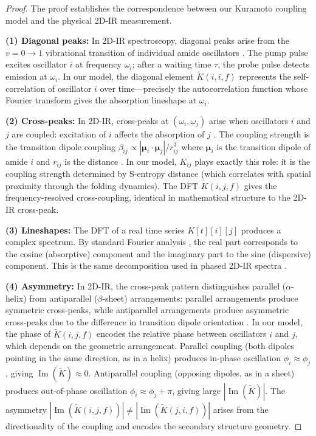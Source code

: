 \documentclass[11pt,twocolumn,a4paper]{article}
\theoremstyle{definition}
\theoremstyle{remark}
\newcommand{\Ktilde}{\tilde{K}}
\newcommand{\natfreq}{\omega}
\begin{document}
\begin{proof}
The proof establishes the correspondence between our Kuramoto coupling model and the physical 2D-IR measurement.

\textbf{(1) Diagonal peaks:} In 2D-IR spectroscopy, diagonal peaks arise from the $v=0 \to 1$ vibrational transition of individual amide oscillators \citep{hamm2011}. The pump pulse excites oscillator $i$ at frequency $\natfreq_i$; after a waiting time $\tau$, the probe pulse detects emission at $\natfreq_i$. In our model, the diagonal element $\Ktilde(i, i, f)$ represents the self-correlation of oscillator $i$ over time---precisely the autocorrelation function whose Fourier transform gives the absorption lineshape at $\natfreq_i$.

\textbf{(2) Cross-peaks:} In 2D-IR, cross-peaks at $(\natfreq_i, \natfreq_j)$ arise when oscillators $i$ and $j$ are coupled: excitation of $i$ affects the absorption of $j$ \citep{hochstrasser2007}. The coupling strength is the transition dipole coupling $\beta_{ij} \propto |\boldsymbol{\mu}_i \cdot \boldsymbol{\mu}_j| / r_{ij}^3$ where $\boldsymbol{\mu}_i$ is the transition dipole of amide $i$ and $r_{ij}$ is the distance \citep{torii1992}. In our model, $K_{ij}$ plays exactly this role: it is the coupling strength determined by S-entropy distance (which correlates with spatial proximity through the folding dynamics). The DFT $\Ktilde(i, j, f)$ gives the frequency-resolved cross-coupling, identical in mathematical structure to the 2D-IR cross-peak.

\textbf{(3) Lineshapes:} The DFT of a real time series $K[t][i][j]$ produces a complex spectrum. By standard Fourier analysis \citep{oppenheim1999}, the real part corresponds to the cosine (absorptive) component and the imaginary part to the sine (dispersive) component. This is the same decomposition used in phased 2D-IR spectra \citep{hamm2011}.

\textbf{(4) Asymmetry:} In 2D-IR, the cross-peak pattern distinguishes parallel ($\alpha$-helix) from antiparallel ($\beta$-sheet) arrangements: parallel arrangements produce symmetric cross-peaks, while antiparallel arrangements produce asymmetric cross-peaks due to the difference in transition dipole orientation \citep{kim2009, ganim2008}. In our model, the phase of $\Ktilde(i, j, f)$ encodes the relative phase between oscillators $i$ and $j$, which depends on the geometric arrangement. Parallel coupling (both dipoles pointing in the same direction, as in a helix) produces in-phase oscillation $\phi_i \approx \phi_j$, giving $\operatorname{Im}(\Ktilde) \approx 0$. Antiparallel coupling (opposing dipoles, as in a sheet) produces out-of-phase oscillation $\phi_i \approx \phi_j + \pi$, giving large $|\operatorname{Im}(\Ktilde)|$. The asymmetry $|\operatorname{Im}(\Ktilde(i,j,f))| \neq |\operatorname{Im}(\Ktilde(j,i,f))|$ arises from the directionality of the coupling and encodes the secondary structure geometry.
\end{proof}
\end{document}
